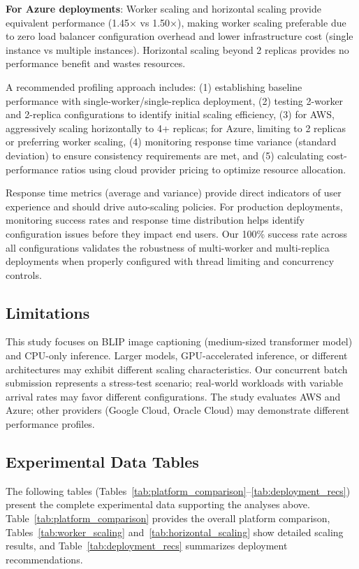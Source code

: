 \textbf{For Azure deployments}: Worker scaling and horizontal scaling provide equivalent performance (1.45× vs 1.50×), making worker scaling preferable due to zero load balancer configuration overhead and lower infrastructure cost (single instance vs multiple instances). Horizontal scaling beyond 2 replicas provides no performance benefit and wastes resources.

A recommended profiling approach includes: (1) establishing baseline performance with single-worker/single-replica deployment, (2) testing 2-worker and 2-replica configurations to identify initial scaling efficiency, (3) for AWS, aggressively scaling horizontally to 4+ replicas; for Azure, limiting to 2 replicas or preferring worker scaling, (4) monitoring response time variance (standard deviation) to ensure consistency requirements are met, and (5) calculating cost-performance ratios using cloud provider pricing to optimize resource allocation.

Response time metrics (average and variance) provide direct indicators of user experience and should drive auto-scaling policies. For production deployments, monitoring success rates and response time distribution helps identify configuration issues before they impact end users. Our 100\% success rate across all configurations validates the robustness of multi-worker and multi-replica deployments when properly configured with thread limiting and concurrency controls.

\subsection{Limitations}

This study focuses on BLIP image captioning (medium-sized transformer model) and CPU-only inference. Larger models, GPU-accelerated inference, or different architectures may exhibit different scaling characteristics. Our concurrent batch submission represents a stress-test scenario; real-world workloads with variable arrival rates may favor different configurations. The study evaluates AWS and Azure; other providers (Google Cloud, Oracle Cloud) may demonstrate different performance profiles.

\subsection{Experimental Data Tables}

The following tables (Tables~\ref{tab:platform_comparison}--\ref{tab:deployment_recs}) present the complete experimental data supporting the analyses above. Table~\ref{tab:platform_comparison} provides the overall platform comparison, Tables~\ref{tab:worker_scaling} and~\ref{tab:horizontal_scaling} show detailed scaling results, and Table~\ref{tab:deployment_recs} summarizes deployment recommendations.

